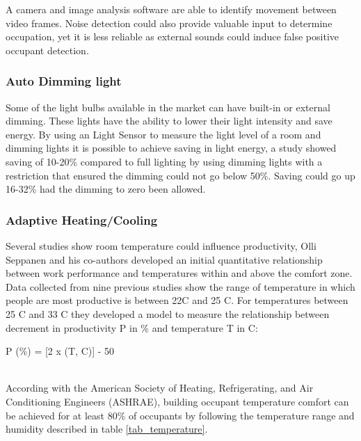 A camera and image analysis software are able to identify movement between video frames. Noise detection could also provide valuable input to determine occupation, yet it is less reliable as external sounds could induce false positive occupant detection.

\subsubsection{Auto Dimming light}

Some of the light bulbs available in the market can have built-in or external dimming. These lights have the ability to lower their light intensity and save energy.
By using an Light Sensor to measure the light level of a room and dimming lights it is possible to achieve saving in light energy, a study \cite{sensor_app_lights} showed saving of 10-20\% compared to full lighting by using dimming lights with a restriction that ensured the dimming could not go below 50\%. Saving could go up 16-32\% had the dimming to zero been allowed.


\subsubsection{Adaptive Heating/Cooling}\label{related:adaptive_heating}


Several studies show room temperature could influence productivity, Olli Seppanen and his co-authors developed an initial quantitative relationship between work performance and temperatures within and above the comfort zone\cite{temperature_survey}. Data collected from nine previous studies show the range of temperature in which people are most productive is between 22C and 25 C. For temperatures between 25 C and 33 C they developed a model to measure the relationship between decrement in productivity P in \% and
temperature T in  C: 

P (\%) = [2 x (T, C)] - 50 


\mbox{}\\
According with the American Society of Heating, Refrigerating, and Air Conditioning Engineers (ASHRAE), building occupant temperature comfort can be achieved for at least 80\% of occupants\cite{std_ASHRAE_55} by following the temperature range and humidity described in table \ref{tab_temperature}.

